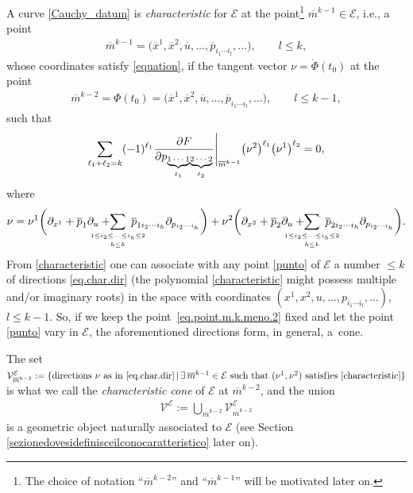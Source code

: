 \documentclass[10pt,a4paper]{amsart}
\newcommand{\M}{\mathcal{V}}
\newcommand{\E}{\mathcal{E}}
\newcommand{\w}{\nu}
\numberwithin{equation}{section}
\begin{document}
A curve \eqref{Cauchy_datum} is \emph{characteristic} for $\E$ at the point\footnote{The choice of notation ``$\overline{m}^{k-2}$'' and ``$\overline{m}^{k-1}$'' will be motivated later on.} $\overline{m}^{k-1}\in\E$, i.e., a point
\begin{gather}\label{punto}
\overline{m}^{k-1}=\big(\overline{x}^{1},\overline{x}^{2},\overline{u},\dots ,\overline{p}_{i_1\cdots i_{l}},\dots\big),\qquad l\leq k,
 \end{gather}
whose coordinates satisfy \eqref{equation},
 if the tangent vector $\w=\dot{\Phi}(t_0)$ at the point
\begin{gather}\label{eq.point.m.k.meno.2}
\overline{m}^{k-2}=\Phi(t_0)=\big(\overline{x}^{1},\overline{x}^{2},\overline
{u},\dots,\overline{p}_{i_1\cdots i_{l}},\dots\big),\qquad l\leq k-1,
\end{gather}
 such that
\begin{gather}\label{characteristic}
\sum_{\ell_1+\ell_2=k} (-1)^{\ell_1} \frac{\partial F}{\partial p_{{\underbrace{\mbox{\scriptsize $1\cdots 1$}}_{\ell_1}}{\underbrace{\mbox{\scriptsize $2\cdots 2$}}_{\ell_2}}}} \Bigg|_{\overline{m}^{k-1}}\big(\w^2\big)^{\ell_1}\big(\w^1\big)^{\ell_2}= 0,
\end{gather}
where
\begin{gather}\label{eq.char.dir}
\w=\w^1\bigg({\partial}_{x^{1}}+\overline{p}_{1}\partial_{u}+\hspace{-7mm}\sum_{\underset{ h\leq k}{\scriptscriptstyle 1\leq i_2\leq\dots\leq i_h\leq 2}}\hspace{-5mm}\overline
{p}_{1i_2\cdots i_h}\partial_{p_{i_2\cdots i_{h}}}\bigg)
+
\w^2\bigg({\partial}_{x^{2}}+\overline{p}_{2}\partial_{u}+\hspace{-7mm}\sum_{\underset{h\leq k}{\scriptscriptstyle 1\leq i_2\leq\dots\leq i_h\leq 2}}\hspace{-5mm}\overline
{p}_{2i_2\cdots i_h}\partial_{p_{i_2\cdots i_{h}}}\bigg).
\end{gather}
From \eqref{characteristic}
one can associate with any point \eqref{punto} of $\E$ a number $\leq k$ of
directions \eqref{eq.char.dir} (the polynomial \eqref{characteristic} might possess multiple and/or imaginary roots) in the space with coordinates $(x^1,x^2,u,\dots,p_{i_1\cdots i_l},\dots)$, $l\leq k-1$. So, if we keep the point~\eqref{eq.point.m.k.meno.2} f\/ixed and let the point \eqref{punto} vary in $\E$, the aforementioned directions form, in general, a~cone.

The set $ \M^\E_{\overline{m}^{k-2}}:=\{\textrm{directions $\w$ as in \eqref{eq.char.dir}}\,|\,\exists\, \overline{m}^{k-1}\in\E \textrm{ such that $(\w^1,\w^2)$ satisf\/ies \eqref{characteristic}}\}$ is what we call the \emph{characteristic cone} of $\E$ at $\overline{m}^{k-2}$, and
the union
\begin{gather}\label{eq.char.cone.1}
\M^\E:=\bigcup_{\overline{m}^{k-2}} \M^\E_{\overline{m}^{k-2}}
\end{gather}
is a geometric object naturally associated to $\E$ (see Section \ref{sezionedovesidefinisceilconocaratteristico} later on).
\end{document}
